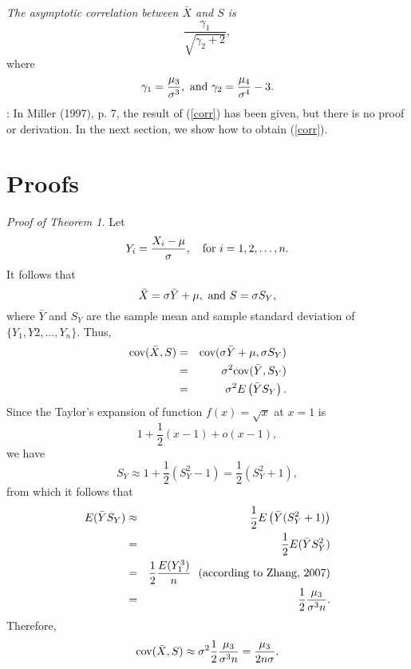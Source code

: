 \documentclass[12pt]{article}
\def\be{\begin{equation}}
\def\ee{\end{equation}}
\begin{document}

 {\it The asymptotic correlation between
$\bar{X}$ and $S$ is} \be \frac{\gamma_1}{\sqrt{\gamma_2+2}},
\label{corr} \ee where
$$
\gamma_1=\frac{\mu_3}{\sigma^3}, \ \hbox{and}\
\gamma_2=\frac{\mu_4}{\sigma^4}-3.
$$
: In Miller (1997), p. 7, the result of
(\ref{corr}) has been given, but there is no proof or derivation.
In the next section, we show how
to obtain (\ref{corr}).


\section{Proofs}

{\it Proof of Theorem 1.} Let
$$
Y_i=\frac{X_i-\mu}{\sigma}, \quad \hbox{for}\ i=1, 2, \ldots, n.
$$
It follows that
$$
\bar{X}=\sigma \bar{Y} + \mu, \ \hbox{and}\ S=\sigma S_Y,
$$
where $\bar{Y}$ and $S_Y$ are the sample mean and sample standard deviation of
$\{Y_1, Y2, \ldots, Y_n\}$. Thus,
\begin{eqnarray*}
 \hbox{cov}(\bar{X}, S)
&=&\hbox{cov}(\sigma\bar{Y}+\mu, \sigma S_Y)\\
&=&\sigma^2 \hbox{cov}(\bar{Y}, S_Y)\\
&=&\sigma^2 E\left(\bar{Y}S_Y\right).
\end{eqnarray*}
Since the Taylor's expansion of function $f(x)=\sqrt{x}$ at $x=1$
is
$$
1+\frac{1}{2}(x-1)+o(x-1),
$$
we have
$$
S_Y\approx 1+\frac{1}{2}(S_Y^2-1)=\frac{1}{2}(S_Y^2+1),
$$
from which it follows that
\begin{eqnarray*}
E(\bar{Y}S_Y)&\approx
 & \frac{1}{2}E\left(\bar{Y}(S_Y^2+1)\right)\\
&=&\frac{1}{2}E(\bar{Y}S_Y^2)\\
&=&\frac{1}{2}\frac{E(Y_1^3)}{n}\ \ \hbox{(according to Zhang,
2007)}\\
&=&\frac{1}{2}\frac{\mu_3}{\sigma^3 n}.
\end{eqnarray*}
Therefore,
$$
\hbox{cov}(\bar{X}, S)\approx \sigma^2 \frac{1}{2}\frac{\mu_3}{\sigma^3
n}=\frac{\mu_3}{2n\sigma}.
$$
\end{document}
